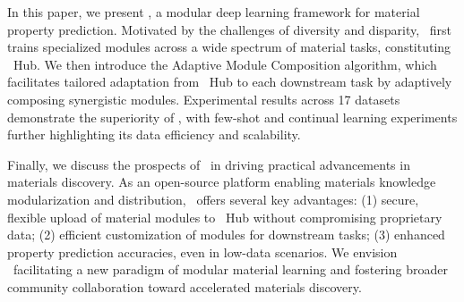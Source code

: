 In this paper, we present \name, a modular deep learning framework for material property prediction.
Motivated by the challenges of diversity and disparity, \name \ first trains specialized modules across a wide spectrum of material tasks, constituting \name \ Hub.
We then introduce the Adaptive Module Composition algorithm, which facilitates tailored adaptation from \name \ Hub to each downstream task by adaptively composing synergistic modules.
Experimental results across 17 datasets demonstrate the superiority of \name, with few-shot and continual learning experiments further highlighting its data efficiency and scalability.

Finally, we discuss the prospects of \name \ in driving practical advancements in materials discovery.
As an open-source platform enabling materials knowledge modularization and distribution, \name \ offers several key advantages: (1) secure, flexible upload of material modules to \name \ Hub without compromising proprietary data; (2) efficient customization of modules for downstream tasks; (3) enhanced property prediction accuracies, even in low-data scenarios.
We envision \name \ facilitating a new paradigm of modular material learning and fostering broader community collaboration toward accelerated materials discovery.